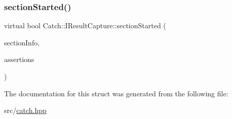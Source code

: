 \mbox{\label{struct_catch_1_1_i_result_capture_a5b76ed52badcb64cf374202e12b81a03}} 
\subsubsection{\texorpdfstring{section\+Started()}{sectionStarted()}}
{\footnotesize\ttfamily virtual bool Catch\+::\+I\+Result\+Capture\+::section\+Started (\begin{DoxyParamCaption}\item[{\hyperlink{struct_catch_1_1_section_info}{Section\+Info} const \&}]{section\+Info,  }\item[{\hyperlink{struct_catch_1_1_counts}{Counts} \&}]{assertions }\end{DoxyParamCaption})\hspace{0.3cm}{\ttfamily [pure virtual]}}



The documentation for this struct was generated from the following file\+:\begin{DoxyCompactItemize}
\item 
src/\hyperlink{catch_8hpp}{catch.\+hpp}\end{DoxyCompactItemize}
